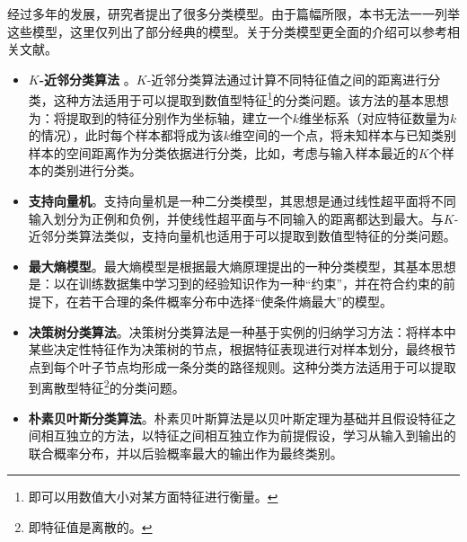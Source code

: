 \parinterval 经过多年的发展，研究者提出了很多分类模型。由于篇幅所限，本书无法一一列举这些模型，这里仅列出了部分经典的模型。关于分类模型更全面的介绍可以参考相关文献。

\begin{itemize}
\vspace{0.5em}
\item{\small\sffamily\bfseries{$K$-近邻分类算法}} 。$K$-近邻分类算法通过计算不同特征值之间的距离进行分类，这种方法适用于可以提取到数值型特征\footnote{即可以用数值大小对某方面特征进行衡量。}的分类问题。该方法的基本思想为：将提取到的特征分别作为坐标轴，建立一个$k$维坐标系（对应特征数量为$k$的情况），此时每个样本都将成为该$k$维空间的一个点，将未知样本与已知类别样本的空间距离作为分类依据进行分类，比如，考虑与输入样本最近的$K$个样本的类别进行分类。
\vspace{0.5em}
\item {\small\sffamily\bfseries{支持向量机}}。支持向量机是一种二分类模型，其思想是通过线性超平面将不同输入划分为正例和负例，并使线性超平面与不同输入的距离都达到最大。与$K$-近邻分类算法类似，支持向量机也适用于可以提取到数值型特征的分类问题。
\vspace{0.5em}
\item {\small\sffamily\bfseries{最大熵模型}}。最大熵模型是根据最大熵原理提出的一种分类模型，其基本思想是：以在训练数据集中学习到的经验知识作为一种“约束”，并在符合约束的前提下，在若干合理的条件概率分布中选择“使条件熵最大”的模型。
\vspace{0.5em}
\item {\small\sffamily\bfseries{决策树分类算法}}。决策树分类算法是一种基于实例的归纳学习方法：将样本中某些决定性特征作为决策树的节点，根据特征表现进行对样本划分，最终根节点到每个叶子节点均形成一条分类的路径规则。这种分类方法适用于可以提取到离散型特征\footnote{即特征值是离散的。}的分类问题。
\vspace{0.5em}
\item {\small\sffamily\bfseries{朴素贝叶斯分类算法}}。朴素贝叶斯算法是以贝叶斯定理为基础并且假设特征之间相互独立的方法，以特征之间相互独立作为前提假设，学习从输入到输出的联合概率分布，并以后验概率最大的输出作为最终类别。
\vspace{0.5em}
\end{itemize}


